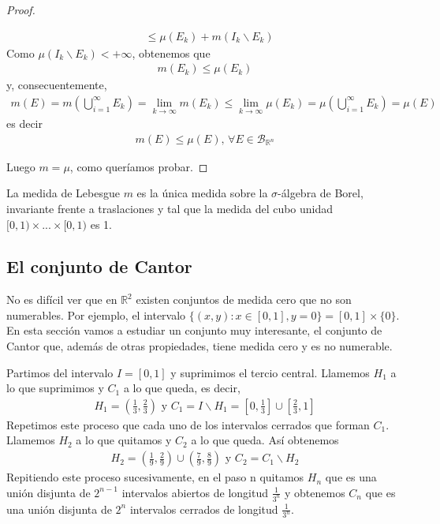 \begin{proof}
\begin{enumerate}
\begin{align*}
                                                 & \leq \mu(E_k) + m(I_k \backslash E_k)
              \end{align*}
              Como $\mu(I_k \backslash E_k) < +\infty$, obtenemos que
              \begin{align*}
                  m(E_k) \leq \mu(E_k)
              \end{align*}
              y, consecuentemente,
              \begin{align*}
                  m(E) = m\left( \bigcup_{i=1}^{\infty}{E_k}\right) = \lim_{k \to \infty}{m(E_k)} \leq \lim_{k \to \infty}{\mu(E_k)} = \mu \left( \bigcup_{i=1}^{\infty}{E_k}\right) = \mu(E)
              \end{align*}
              es decir
              \begin{align*}
                  m(E) \leq \mu(E) \text{, } \forall E \in \mathcal{B}_{\mathbb{R}^n}
              \end{align*}
    \end{enumerate}
    Luego $m = \mu$, como queríamos probar.
\end{proof}
\begin{teo}
    La medida de Lebesgue $m$ es la única medida sobre la $\sigma$-álgebra de Borel, invariante frente a traslaciones y tal que la medida del cubo unidad $[0,1) \times ... \times [0,1)$ es 1.
\end{teo}

\subsection{El conjunto de Cantor}
No es difícil ver que en $\mathbb{R}^2$ existen conjuntos de medida cero que no son numerables. Por ejemplo, el intervalo $\{ (x,y) : x \in [0,1], y = 0\} = [0,1] \times \{0\}$. En esta sección vamos a estudiar un conjunto muy interesante, el conjunto de Cantor que, además de otras propiedades, tiene medida cero y es no numerable.

Partimos del intervalo $I = [0,1]$ y suprimimos el tercio central. Llamemos $H_1$ a lo que suprimimos y $C_1$ a lo que queda, es decir,
\begin{align*}
    H_1 = \left( \frac{1}{3}, \frac{2}{3}\right) \text{ y } C_1 = I \backslash H_1 = \left[ 0, \frac{1}{3} \right] \cup \left[ \frac{2}{3}, 1\right]
\end{align*}
Repetimos este proceso que cada uno de los intervalos cerrados que forman $C_1$. Llamemos $H_2$ a lo que quitamos y $C_2$ a lo que queda. Así obtenemos
\begin{align*}
    H_2 = \left( \frac{1}{9}, \frac{2}{9}\right) \cup \left( \frac{7}{9}, \frac{8}{9}\right) \text{ y } C_2 = C_1 \backslash H_2
\end{align*}
Repitiendo este proceso sucesivamente, en el paso n quitamos $H_n$ que es una unión disjunta de $2^{n-1}$ intervalos abiertos de longitud $\frac{1}{3^n}$ y obtenemos $C_n$ que es una unión disjunta de $2^n$ intervalos cerrados de longitud $\frac{1}{3^n}$.

